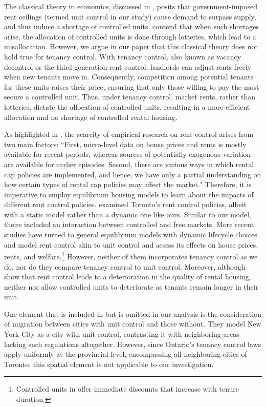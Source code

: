 \documentclass[parskip=full]{article}
\begin{document}
The classical theory in economics, discussed in \citet{suen-1989}, posits that government-imposed rent ceilings (termed unit control in our study) cause demand to surpass supply, and thus induce a shortage of controlled units. \citet{gl-2003} contend that when such shortages arise, the allocation of controlled units is done through lotteries, which lead to a misallocation. However, we argue in our paper that this classical theory does not hold true for tenancy control. With tenancy control, also known as vacancy decontrol or the third generation rent control, landlords can adjust rents freely when new tenants move in. Consequently, competition among potential tenants for these units raises their price, ensuring that only those willing to pay the most secure a controlled unit. Thus, under tenancy control, market rents, rather than lotteries, dictate the allocation of controlled units, resulting in a more efficient allocation and no shortage of controlled rental housing.

As highlighted in \citet{mm-2023}, the scarcity of empirical research on rent control arises from two main factors: ``First, micro-level data on house prices and rents is mostly available for recent periods, whereas sources of potentially exogenous variation are available for earlier episodes. Second, there are various ways in which rental cap policies are implemented, and hence, we have only a partial understanding on how certain types of rental cap policies may affect the market." Therefore, it is imperative to employ equilibrium housing models to learn about the impacts of different rent control policies. \citet{fallis-1985} examined Toronto's rent control policies, albeit with a static model rather than a dynamic one like ours. Similar to our model, theirs included an interaction between controlled and free markets. More recent studies have turned to general equilibrium models with dynamic lifecycle choices. \citet{eric-1995} and \citet{fmn-2023} model rent control akin to unit control and assess its effects on house prices, rents, and welfare.\footnote{Controlled units in \citet{fmn-2023} offer immediate discounts that increase with tenure duration.} However, neither of them incorporates tenancy control as we do, nor do they compare tenancy control to unit control. Moreover, although \citet{ms-1993} show that rent control leads to a deterioration in the quality of rental housing, neither \citet{eric-1995} nor \citet{fmn-2023} allow controlled units to deteriorate as tenants remain longer in their unit.

One element that is included in \citet{fmn-2023} but is omitted in our analysis is the consideration of migration between cities with unit control and those without. They model New York City as a city with unit control, contrasting it with neighboring areas lacking such regulations altogether. However, since Ontario's tenancy control laws apply uniformly at the provincial level, encompassing all neighboring cities of Toronto, this spatial element is not applicable to our investigation.
\end{document}
